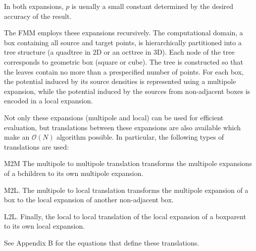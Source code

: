 \documentclass[11pt, oneside]{article}   	%
\begin{document}
In both expansions, $p$ is usually a small constant determined by the desired accuracy of the result. 

The FMM employs these expansions recursively. The computational domain, a box containing all source and target points, is hierarchically partitioned into a tree structure (a quadtree in 2D or an octtree in 3D). Each node of the tree corresponds to geometric box (square or cube). The tree is constructed so that the leaves contain no more than a prespecified number of points. For each box, the potential induced by its source densities is represented using a multipole expansion, while the potential induced by the sources from non-adjacent boxes is encoded in a local expansion.

Not only these expansions (multipole and local) can be used for efficient evaluation, but translations between these expansions are also available which make an $\mathcal{O}(N)$ algorithm possible. In particular, the following types of translations are used:

M2M The multipole to multipole translation transforms the multipole expansions of a bchildren to its own multipole expansion.

M2L. The multipole to local translation transforms the multipole expansion of a box to the local expansion
of another non-adjacent box.

L2L. Finally, the local to local translation of the local expansion of a boxparent to its own local expansion.

See Appendix B for the equations that define these translations.
\end{document}
